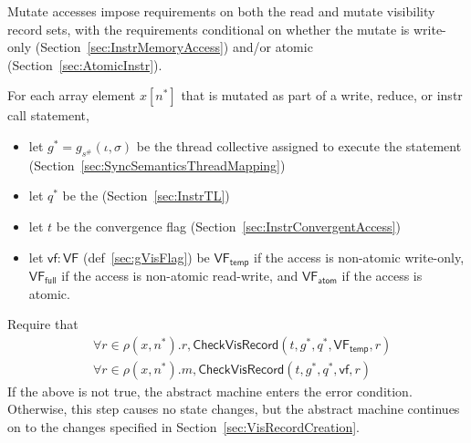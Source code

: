 

Mutate accesses impose requirements on both the read and mutate visibility record sets, with the requirements conditional on whether the mutate is write-only (Section~\ref{sec:InstrMemoryAccess}) and/or atomic (Section~\ref{sec:AtomicInstr}).

For each array element $x[n^*]$ that is mutated as part of a write, reduce, or instr call statement,
\begin{itemize}
  \item let $g^* = g_{s^\#}(\iota, \sigma)$ be the thread collective assigned to execute the statement (Section~\ref{sec:SyncSemanticsThreadMapping})
  \item let $q^*$ be the  (Section~\ref{sec:InstrTL})
  \item let $t$ be the convergence flag (Section~\ref{sec:InstrConvergentAccess})
  \item let $\mathsf{vf}: \mathsf{VF}$ (def~\ref{sec:gVisFlag}) be $\mathsf{VF_{temp}}$ if the access is non-atomic write-only, $\mathsf{VF_{full}}$ if the access is non-atomic read-write, and $\mathsf{VF_{atom}}$ if the access is atomic.
\end{itemize}
Require that
\begin{align*}
    & \forall r \in \rho(x, n^*).r, \mathsf{CheckVisRecord}(t, g^*, q^*, \mathsf{VF_{temp}}, r) \\
    & \forall r \in \rho(x, n^*).m, \mathsf{CheckVisRecord}(t, g^*, q^*, \mathsf{vf}, r)
\end{align*}
If the above is not true, the abstract machine enters the error condition.
Otherwise, this step causes no state changes, but the abstract machine continues on to the changes specified in Section~\ref{sec:VisRecordCreation}.

